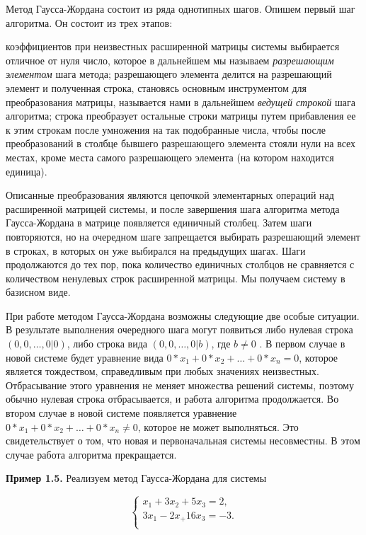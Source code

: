 \documentclass{article}
\begin{document}
Метод Гаусса-Жордана состоит из ряда однотипных шагов. Опишем первый шаг алгоритма. Он состоит из трех этапов: 
		\begin{enumerate}
			\renewcommand{\theenumi}{(\arabic{enumi})}
			\renewcommand{\labelenumi}{\arabic{enumi})}
			 коэффициентов при неизвестных расширенной матрицы системы выбирается отличное от нуля число, которое в дальнейшем мы называем  \textit{разрешающим элементом} шага метода;
			 разрешающего элемента делится на разрешающий элемент и полученная строка, становясь основным инструментом для преобразования матрицы, называется нами в дальнейшем \textit{ведущей строкой} шага алгоритма;
			 строка преобразует остальные строки матрицы путем прибавления ее к этим строкам после умножения на так подобранные числа, чтобы после преобразований в столбце бывшего разрешающего элемента стояли нули на всех местах, кроме места самого разрешающего элемента (на котором находится единица).
		\end{enumerate}

Описанные преобразования являются цепочкой элементарных операций над расширенной матрицей системы, и после завершения шага алгоритма метода Гаусса-Жордана в матрице появляется единичный столбец. Затем шаги повторяются, но на очередном шаге запрещается выбирать разрешающий элемент в строках, в которых он уже выбирался на предыдущих шагах. Шаги продолжаются до тех пор, пока количество единичных столбцов не сравняется с количеством ненулевых строк расширенной матрицы. Мы получаем систему в базисном виде.

При работе методом Гаусса-Жордана возможны следующие две особые ситуации. В результате выполнения очередного шага могут появиться либо нулевая строка
$(0, 0,\dots, 0|0)$, либо строка вида $(0, 0,\dots, 0|b)$, где $b \neq 0$ . В первом случае в новой системе будет уравнение вида $0*x_1 + 0*x_2 + \dots + 0*x_n=0$, которое является тождеством, справедливым при любых значениях неизвестных. Отбрасывание этого уравнения не меняет множества решений системы, поэтому обычно нулевая строка отбрасывается, и работа алгоритма продолжается. Во втором случае в новой системе появляется уравнение $0*x_1 + 0*x_2 + \dots + 0*x_n \neq 0$, которое не может выполняться. Это свидетельствует о том, что новая и первоначальная системы несовместны. В этом случае работа алгоритма прекращается.

\textbf{Пример 1.5.}  Реализуем метод Гаусса-Жордана для системы

\begin{equation*}
\begin{cases}
x_1+ 3x_2+ 5x_3 = 2,\\
3x_1- 2x_+ 16x_3 = -3.\\
\end{cases}
\end{equation*}
\end{document}
